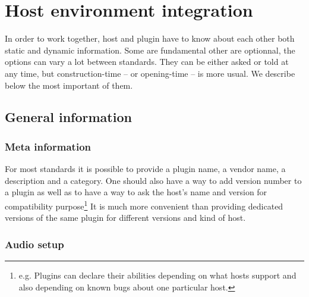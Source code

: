 

\chapter{Host environment integration}
\noindent In order to work together, host and plugin have to know about each other both static and dynamic information. Some are fundamental other are optionnal, the options can vary a lot between standards. They can be either asked or told at any time, but construction-time -- or opening-time -- is more usual. We describe below the most important of them. 

\section{General information}

\subsection{Meta information}
\noindent For most standards it is possible to provide a plugin name, a vendor name, a description and a category. One should also have a way to add version number to a plugin as well as to have a way to ask the host's name and version for compatibility purpose\footnote{e.g. Plugins can declare their abilities depending on what hosts support and also depending on known bugs about one particular host.} It is much more convenient than providing dedicated versions of the same plugin for different versions and kind of host.

\subsection{Audio setup}
